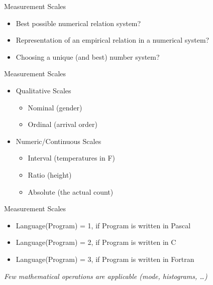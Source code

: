 \documentclass{beamer}
\begin{document}
\begin{frame}{\centerline{Measurement Scales}}

\begin{itemize}
\item Best possible numerical relation system?
\item Representation of an empirical relation in a numerical system?
\item Choosing a unique (and best) number system?

\end{itemize}

\end{frame}

\begin{frame}{\centerline{Measurement Scales}}

\begin{itemize}

\item Qualitative Scales
\begin{itemize}
\item Nominal (gender)
\item Ordinal (arrival order)
\end{itemize}
\item Numeric/Continuous Scales
\begin{itemize}
\item Interval (temperatures in F)
\item Ratio (height)
\item Absolute (the actual count)
\end{itemize}
\end{itemize}

\end{frame}

\begin{frame}{\centerline{Measurement Scales}}

\begin{itemize}
\item Language(Program) = 1, if Program is written in Pascal
\item Language(Program) = 2, if Program is written in C
\item Language(Program) = 3, if Program is written in Fortran
\end{itemize}
\textit{Few mathematical operations are applicable (mode, histograms, …)}
\end{frame}
\end{document}
